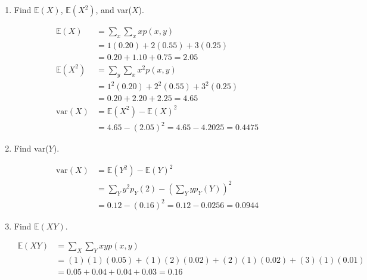     \begin{enumerate}[label=(\alph*)]
        \item Find $\mathbb{E}(X)$, $\mathbb{E}(X^{2})$, and var($X$).
        \\
        \begin{mdframed}
            \begin{align*}
                \mathbb{E}(X)       & = \sum_{x}\sum_{x}xp(x,y)                 \\
                                    & = 1(0.20) + 2(0.55) + 3(0.25)             \\
                                    & = 0.20 + 1.10 + 0.75 = \boxed{2.05}       \\
                \mathbb{E}(X^{2})   & = \sum_{y}\sum_{x}x^{2}p(x,y)             \\
                                    & = 1^{2}(0.20) + 2^{2}(0.55) + 3^{2}(0.25) \\
                                    & = 0.20 + 2.20 + 2.25 = \boxed{4.65}       \\
                \text{var}(X)       & = \mathbb{E}(X^{2}) - \mathbb{E}(X)^{2}   \\
                                    & = 4.65 - (2.05)^{2} = 4.65 - 4.2025 = \boxed{0.4475}
            \end{align*}
        \end{mdframed}

        \item Find var($Y$).
        \\
        \begin{mdframed}
            \begin{align*}
                \text{var}(X)       & = \mathbb{E}(Y^{2}) - \mathbb{E}(Y)^{2}   \\
                                    & = \sum_{Y}y^{2}p_Y(2) - \left(\sum_{Y}yp_{Y}(Y)\right)^{2}   \\
                                    & = 0.12 - (0.16)^{2} = 0.12 - 0.0256 = \boxed{0.0944}
            \end{align*}
        \end{mdframed}

        \item Find $\mathbb{E}(XY)$.
        \\
        \begin{mdframed}
            \begin{align*}
                \mathbb{E}(XY)  & = \sum_{X}\sum_{Y}xyp(x,y)        \\
                                & = (1)(1)(0.05) + (1)(2)(0.02) + (2)(1)(0.02) + (3)(1)(0.01)    \\
                                & = 0.05 + 0.04 + 0.04 + 0.03 = \boxed{0.16}
            \end{align*}
        \end{mdframed}


\end{enumerate}
